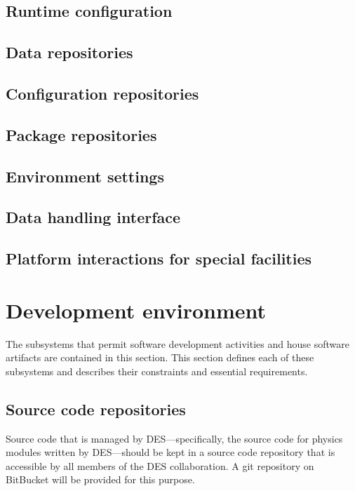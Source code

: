 \documentclass[draftmode,draftwater]{memarticle}
\begin{document}
\subsection{Runtime configuration}

\subsection{Data repositories}

\subsection{Configuration repositories}

\subsection{Package repositories}

\subsection{Environment settings}

\subsection{Data handling interface}

\subsection{Platform interactions for special facilities}

\section{Development environment}

The subsystems that permit software development activities and house
software artifacts are contained in this section. This section defines
each of these subsystems and describes their constraints and essential
requirements.

\subsection{Source code repositories}

Source code that is managed by DES---specifically, the source code for
physics modules written by DES---should be kept in a source code
repository that is accessible by all members of the DES collaboration. A
git repository on BitBucket will be provided for this purpose.
\end{document}
